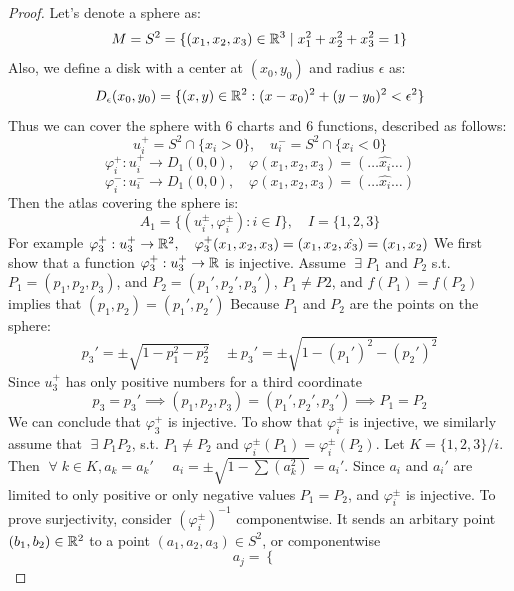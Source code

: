\documentclass[11pt,a4paper]{report}
\begin{document}
\begin{proof}
Let's denote a sphere as:
\begin{equation} \label{s2}
 M = S^2 = \{(x_1,x_2,x_3) \in \mathbb{R}^3 \mid x_1^2 + x_2^2 + x_3^2 = 1 \} 
\end{equation}
Also, we define a disk with a center at $(x_0,y_0)$ and radius $\epsilon$ as:
$$ D_{\epsilon}(x_0,y_0) = \{(x,y) \in \mathbb{R}^2 : (x-x_0)^2 + (y-y_0)^2 < \epsilon^2 \} $$
\noindent Thus we can cover the sphere with 6 charts and 6 functions, described as follows:
$$ u_i^{+} = S^2 \cap \{x_i > 0 \}, \quad u_i^{-} = S^2 \cap \{x_i < 0 \} $$
$$ \varphi_i^{+}: u_i^{+} \to D_{1}(0,0), \quad \varphi(x_1,x_2,x_3) = (\dots \hat{x_i} \dots)$$
$$ \varphi_i^{-}: u_i^{-} \to D_{1}(0,0), \quad \varphi(x_1,x_2,x_3) = (\dots \hat{x_i} \dots)$$
Then the atlas covering the sphere is:
$$ A_1 = \{(u_i^{\pm},\varphi_i^{\pm}) : i \in I \}, \quad I = \{ 1,2,3 \} $$
For example $\varphi_3^{+}: u_3^{+} \to \mathbb{R}^2, \quad \varphi_3^{+}(x_1,x_2,x_3) = (x_1,x_2,\hat{x_3}) =(x_1,x_2)$
\newline
\newline
We first show that a function $\varphi_3^{+}: u_3^{+} \to \mathbb{R}$ is injective.
\newline
Assume $ \; \exists \; P_1$ and $P_2$ s.t. $P_1 = (p_1,p_2,p_3)$,
and $P_2 = (p_1',p_2',p_3')$, $P_1 \neq P2$, and $f(P_1) = f(P_2)$ implies that $(p_1,p_2) = (p_1 ', p_2 ')$
Because $P_1$ and $P_2$ are the points on the sphere:
$$p_3 ' = \pm \sqrt{1-p_1^2-p_2^2} \quad \pm p_3' = \pm \sqrt{1-(p_1')^2-(p_2')^2}$$
Since $u_3^{+}$ has only positive numbers for a third coordinate
$$ p_3 = p_3' \implies (p_1,p_2,p_3) = (p_1 ',p_2 ',p_3 ') \implies P_1=P_2$$
We can conclude that $\varphi_3^{+}$ is injective.
\newline
\newline
To show that $\varphi_i^{\pm}$ is injective, we similarly assume that $ \; \exists \; P_1 P_2$, s.t. $P_1 \neq P_2$ and 
$\varphi_i^{\pm}(P_1) = \varphi_i^{\pm}(P_2)$. Let $K= \{1,2,3\}/i$. Then $ \; \forall \; k \in K, a_k= a_k '$ 
$\quad a_i = \pm \sqrt{1-\sum(a_k^2)} = a_i '$. Since $a_i$ and $a_i '$ are limited to only positive or only negative values  $P_1 = P_2$, and $\varphi_i^{\pm}$ is injective.
\newline
\newline
To prove surjectivity, consider $(\varphi_i^{\pm})^{-1}$ componentwise. It sends an arbitary point $(b_1,b_2) \in \mathbb{R}^2$ to a point $(a_1,a_2,a_3) \in S^2$, or componentwise
\[
  a_j =
  \begin{cases}

\end{cases}\]
\end{proof}
\end{document}
